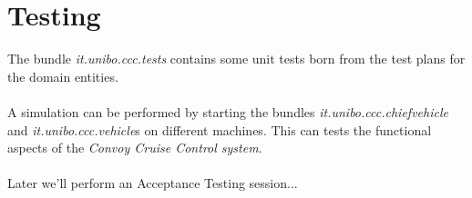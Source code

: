 \documentclass{llncs}
\newcommand{\labelsec}[1]{\label{sec:#1}}
\newcommand{\labelfig}[1]{\label{fig:#1}}
\begin{document}
\newpage
\section{Testing}
\labelsec{testing}
The bundle \emph{it.unibo.ccc.tests} contains some unit tests born from the test plans for the domain entities.\\\\
A simulation can be performed by starting the bundles \emph{it.unibo.ccc.chiefvehicle} and \emph{it.unibo.ccc.vehicle}s on different machines. This can tests the functional aspects of the \emph{Convoy Cruise Control system}.\\\\
Later we'll perform an Acceptance Testing session... \\\\








\appendix



%
\end{document}
